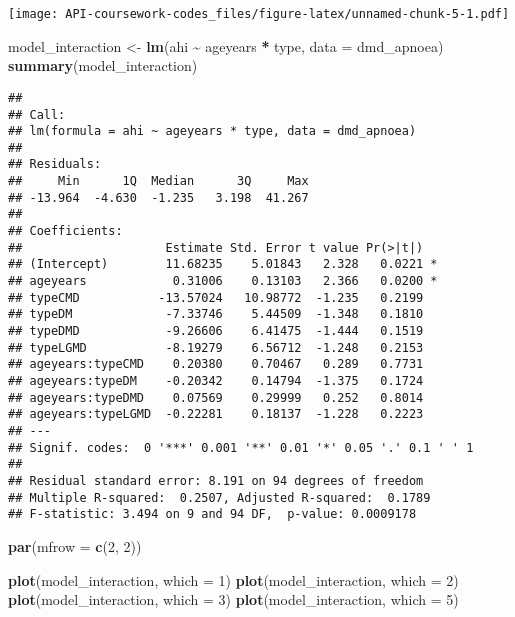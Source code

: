 \documentclass[
]{article}
\newenvironment{Shaded}{\begin{snugshade}}{\end{snugshade}}
\newcommand{\AttributeTok}[1]{\textcolor[rgb]{0.13,0.29,0.53}{#1}}
\newcommand{\DecValTok}[1]{\textcolor[rgb]{0.00,0.00,0.81}{#1}}
\newcommand{\FunctionTok}[1]{\textcolor[rgb]{0.13,0.29,0.53}{\textbf{#1}}}
\newcommand{\NormalTok}[1]{#1}
\newcommand{\OtherTok}[1]{\textcolor[rgb]{0.56,0.35,0.01}{#1}}
\newcommand{\SpecialCharTok}[1]{\textcolor[rgb]{0.81,0.36,0.00}{\textbf{#1}}}
\begin{document}
\texttt{[image: API-coursework-codes\_files/figure-latex/unnamed-chunk-5-1.pdf]}

\begin{Shaded}
\begin{Highlighting}[]
\NormalTok{model\_interaction }\OtherTok{\textless{}{-}} \FunctionTok{lm}\NormalTok{(ahi }\SpecialCharTok{\textasciitilde{}}\NormalTok{ ageyears }\SpecialCharTok{*}\NormalTok{ type, }\AttributeTok{data =}\NormalTok{ dmd\_apnoea)}
\FunctionTok{summary}\NormalTok{(model\_interaction)}
\end{Highlighting}
\end{Shaded}

\begin{verbatim}
## 
## Call:
## lm(formula = ahi ~ ageyears * type, data = dmd_apnoea)
## 
## Residuals:
##     Min      1Q  Median      3Q     Max 
## -13.964  -4.630  -1.235   3.198  41.267 
## 
## Coefficients:
##                    Estimate Std. Error t value Pr(>|t|)  
## (Intercept)        11.68235    5.01843   2.328   0.0221 *
## ageyears            0.31006    0.13103   2.366   0.0200 *
## typeCMD           -13.57024   10.98772  -1.235   0.2199  
## typeDM             -7.33746    5.44509  -1.348   0.1810  
## typeDMD            -9.26606    6.41475  -1.444   0.1519  
## typeLGMD           -8.19279    6.56712  -1.248   0.2153  
## ageyears:typeCMD    0.20380    0.70467   0.289   0.7731  
## ageyears:typeDM    -0.20342    0.14794  -1.375   0.1724  
## ageyears:typeDMD    0.07569    0.29999   0.252   0.8014  
## ageyears:typeLGMD  -0.22281    0.18137  -1.228   0.2223  
## ---
## Signif. codes:  0 '***' 0.001 '**' 0.01 '*' 0.05 '.' 0.1 ' ' 1
## 
## Residual standard error: 8.191 on 94 degrees of freedom
## Multiple R-squared:  0.2507, Adjusted R-squared:  0.1789 
## F-statistic: 3.494 on 9 and 94 DF,  p-value: 0.0009178
\end{verbatim}

\begin{Shaded}
\begin{Highlighting}[]
\FunctionTok{par}\NormalTok{(}\AttributeTok{mfrow =} \FunctionTok{c}\NormalTok{(}\DecValTok{2}\NormalTok{, }\DecValTok{2}\NormalTok{))}

\FunctionTok{plot}\NormalTok{(model\_interaction, }\AttributeTok{which =} \DecValTok{1}\NormalTok{)}
\FunctionTok{plot}\NormalTok{(model\_interaction, }\AttributeTok{which =} \DecValTok{2}\NormalTok{)}
\FunctionTok{plot}\NormalTok{(model\_interaction, }\AttributeTok{which =} \DecValTok{3}\NormalTok{)}
\FunctionTok{plot}\NormalTok{(model\_interaction, }\AttributeTok{which =} \DecValTok{5}\NormalTok{)}
\end{Highlighting}
\end{Shaded}
\end{document}
